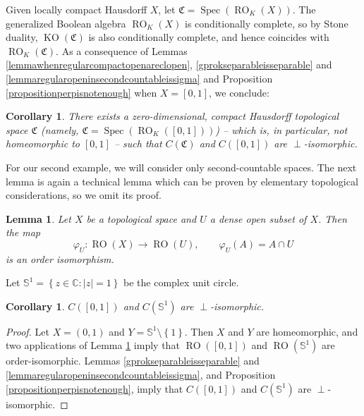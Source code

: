\documentclass[letter,11pt]{amsart}
\theoremstyle{plain}		\newtheorem{theorem}[generalnumbering]{Theorem}
\theoremstyle{plain}		\newtheorem{corollary}[generalnumbering]{Corollary}
\theoremstyle{definition}		\newtheorem{definition}[generalnumbering]{Definition}
\theoremstyle{definition}		\newtheorem{example}[generalnumbering]{Example}
\theoremstyle{plain}		\newtheorem{proposition}[generalnumbering]{Proposition}
\theoremstyle{plain}		\newtheorem{lemma}[generalnumbering]{Lemma}
\theoremstyle{definition}
\begin{document}
Given locally compact Hausdorff $X$, let $\mathfrak{C}=\operatorname{Spec}(\operatorname{RO}_K(X))$. The generalized Boolean algebra $\operatorname{RO}_K(X)$ is conditionally complete, so by Stone duality, $\operatorname{KO}(\mathfrak{C})$ is also conditionally complete, and hence coincides with $\operatorname{RO}_K(\mathfrak{C})$. As a consequence of Lemmas \ref{lemmawhenregularcompactopenareclopen}, \ref{gprokseparableisseparable} and \ref{lemmaregularopeninsecondcountableissigma} and Proposition \ref{propositionperpisnotenough} when $X=[0,1]$, we conclude:

\begin{corollary}\label{corollary01stoneperp}
	There exists a zero-dimensional, compact Hausdorff topological space $\mathfrak{C}$ (name\-ly, $\mathfrak{C}=\operatorname{Spec}(\operatorname{RO}_K([0,1]))$) -- which is, in particular, not homeomorphic to $[0,1]$ -- such that $C(\mathfrak{C})$ and $C([0,1])$ are $\perp$-isomorphic.
\end{corollary}

For our second example, we will consider only second-countable spaces. The next lemma is again a technical lemma which can be proven by elementary topological considerations, so we omit its proof.

\begin{lemma}\label{lemmamorphismregularopenofsubset}
	Let $X$ be a topological space and $U$ a dense open subset of $X$. Then the map
	\[\varphi_U\colon \operatorname{RO}(X)\to\operatorname{RO}(U),\qquad \varphi_U(A)=A\cap U\]
	is an order isomorphism.
\end{lemma}

Let $\mathbb{S}^1=\left\{z\in\mathbb{C}:|z|=1\right\}$ be the complex unit circle.

\begin{corollary}\label{corollary01circleperp}
	$C([0,1])$ and $C(\mathbb{S}^1)$ are $\perp$-isomorphic.
\end{corollary}
\begin{proof}
	Let $X=(0,1)$ and $Y=\mathbb{S}^1\setminus\left\{1\right\}$. Then $X$ and $Y$ are homeomorphic, and two applications of Lemma \ref{lemmamorphismregularopenofsubset} imply that $\operatorname{RO}([0,1])$ and $\operatorname{RO}(\mathbb{S}^1)$ are order-isomorphic. Lemmas \ref{gprokseparableisseparable} and \ref{lemmaregularopeninsecondcountableissigma}, and Proposition \ref{propositionperpisnotenough}, imply that $C([0,1])$ and $C(\mathbb{S}^1)$ are $\perp$-isomorphic.
\end{proof}
\end{document}
